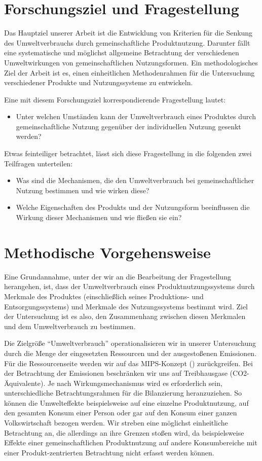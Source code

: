 \documentclass[11pt, titlepage=true]{scrartcl} %
\begin{document}
 
\section{Forschungsziel und Fragestellung}
Das Hauptziel unserer Arbeit ist die Entwicklung von Kriterien für die Senkung des Umweltverbrauchs durch gemeinschaftliche Produktnutzung. Darunter fällt eine systematische und möglichst allgemeine Betrachtung der verschiedenen Umweltwirkungen von gemeinschaftlichen Nutzungsformen. Ein methodologisches Ziel der Arbeit ist es, einen einheitlichen Methodenrahmen für die Untersuchung verschiedener Produkte und Nutzungssysteme zu entwickeln.

Eine mit diesem Forschungsziel korrespondierende Fragestellung lautet:
\begin{itemize}
	\item Unter welchen Umständen kann der Umweltverbrauch eines Produktes durch gemeinschaftliche Nutzung gegenüber der individuellen Nutzung gesenkt werden?
\end{itemize}
Etwas feinteiliger betrachtet, lässt sich diese Fragestellung in die folgenden zwei Teilfragen unterteilen:
\begin{itemize}
	\item Was sind die Mechanismen, die den Umweltverbrauch bei gemeinschaftlicher Nutzung bestimmen und wie wirken diese?
	\item Welche Eigenschaften des Produkts und der Nutzungsform beeinflussen die Wirkung dieser Mechanismen und wie fließen sie ein?
\end{itemize}

\section{Methodische Vorgehensweise}
Eine Grundannahme, unter der wir an die Bearbeitung der Fragestellung herangehen, ist, dass der Umweltverbrauch eines Produktnutzungssystems durch Merkmale des Produktes (einschließlich seines Produktions- und Entsorgungssystems) und Merkmale des Nutzungssystems bestimmt wird. Ziel der Untersuchung ist es also, den Zusammenhang zwischen diesen Merkmalen und dem Umweltverbrauch zu bestimmen.

Die Zielgröße \enquote{Umweltverbrauch} operationalisieren wir in unserer Untersuchung durch die Menge der eingesetzten Ressourcen und der ausgestoßenen Emissionen. Für die Ressourcenseite werden wir auf das MIPS-Konzept () zurückgreifen. Bei der Betrachtung der Emissionen beschränken wir uns auf Treibhausgase (CO2-Äquivalente). Je nach Wirkungsmechanismus wird es erforderlich sein, unterschiedliche Betrachtungsrahmen für die Bilanzierung heranzuziehen. So können die Umwelteffekte beispielsweise auf eine einzelne Produktnutzung, auf den gesamten Konsum einer Person oder gar auf den Konsum einer ganzen Volkswirtschaft bezogen werden. Wir streben eine möglichst einheitliche Betrachtung an, die allerdings an ihre Grenzen stoßen wird, da beispielsweise Effekte einer gemeinschaftlichen Produktnutzung auf andere Konsumbereiche mit einer Produkt-zentrierten Betrachtung nicht erfasst werden können.
\end{document}
